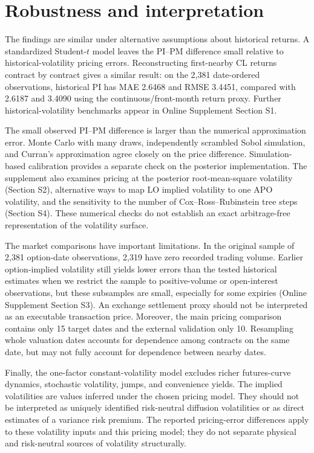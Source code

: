\section{Robustness and interpretation}\label{sec:short_robustness}

The findings are similar under alternative assumptions about historical returns. A standardized Student-\(t\) model leaves the PI--PM difference small relative to historical-volatility pricing errors. Reconstructing first-nearby CL returns contract by contract gives a similar result: on the 2,381 date-ordered observations, historical PI has MAE 2.6468 and RMSE 3.4451, compared with 2.6187 and 3.4090 using the continuous/front-month return proxy. Further historical-volatility benchmarks appear in Online Supplement Section S1.

The small observed PI--PM difference is larger than the numerical approximation error. Monte Carlo with many draws, independently scrambled Sobol simulation, and Curran's approximation agree closely on the price difference. Simulation-based calibration provides a separate check on the posterior implementation. The supplement also examines pricing at the posterior root-mean-square volatility (Section S2), alternative ways to map LO implied volatility to one APO volatility, and the sensitivity to the number of Cox--Ross--Rubinstein tree steps (Section S4). These numerical checks do not establish an exact arbitrage-free representation of the volatility surface.

The market comparisons have important limitations. In the
original sample of 2,381 option-date observations, 2,319
have zero recorded trading volume.
Earlier option-implied volatility still yields lower errors
than the tested historical estimates when we restrict the
sample to positive-volume or open-interest observations,
but these subsamples are small, especially for some expiries
(Online Supplement Section S3).
An exchange settlement proxy should not be interpreted
as an executable transaction price. Moreover, the main pricing comparison contains only 15 target dates and the external validation only 10. Resampling whole valuation dates accounts for dependence among contracts on the same date, but may not fully account for dependence between nearby dates.

Finally, the one-factor constant-volatility model excludes richer futures-curve dynamics, stochastic volatility, jumps, and convenience yields. The implied volatilities are values inferred under the chosen pricing model. They should not be interpreted as uniquely identified risk-neutral diffusion volatilities or as direct estimates of a variance risk premium. The reported pricing-error differences apply to these volatility inputs and this pricing model; they do not separate physical and risk-neutral sources of volatility structurally.

